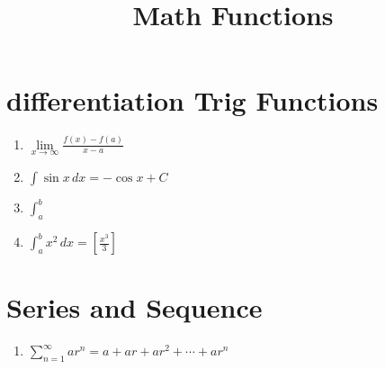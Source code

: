 \documentclass[14pt]{article}
\title{Math Functions}
\begin{document}
\maketitle


	\section{differentiation Trig Functions}
	\begin{enumerate}
		\item $\displaystyle{\lim \limits_{x \to \infty}}\frac{f(x)-f(a)}{x-a}$\\

		\item ${\int \sin x \,dx= - \cos x + C}$\\

		\item $\displaystyle{\int_a^b} $\\
		\item $\displaystyle {\int_a^b x^2 \,dx}=\left [\frac{x^3}{3} \right]$

	\end{enumerate}
	\section{Series and Sequence}
	\begin{enumerate}
		\item $\displaystyle {\sum \limits_{n=1} ^ \infty ar^n=a+ar+ar^2+\cdots +ar^n}$\\

	\end{enumerate}
\end{document}
